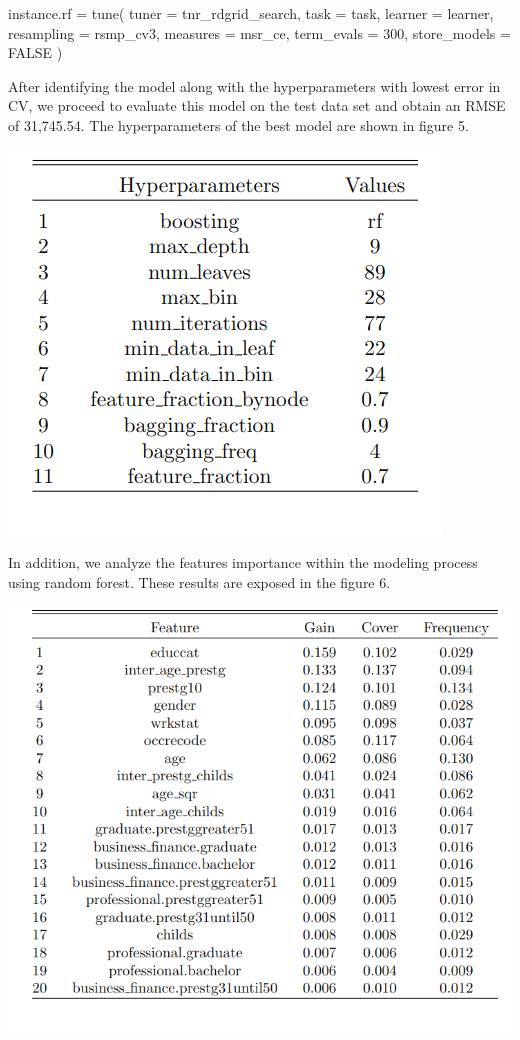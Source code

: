 \documentclass[11pt,a4paper]{article}
\let\origfigure\figure
\let\endorigfigure\endfigure
\renewenvironment{figure}[1][2] {
    \expandafter\origfigure\expandafter[H]
} {
    \endorigfigure
}
\newenvironment{Shaded}{\begin{snugshade}}{\end{snugshade}}
\newcommand{\AttributeTok}[1]{\textcolor[rgb]{0.77,0.63,0.00}{#1}}
\newcommand{\ConstantTok}[1]{\textcolor[rgb]{0.00,0.00,0.00}{#1}}
\newcommand{\DecValTok}[1]{\textcolor[rgb]{0.00,0.00,0.81}{#1}}
\newcommand{\FunctionTok}[1]{\textcolor[rgb]{0.00,0.00,0.00}{#1}}
\newcommand{\NormalTok}[1]{#1}
\newcommand{\OtherTok}[1]{\textcolor[rgb]{0.56,0.35,0.01}{#1}}
\begin{document}
\begin{Shaded}
\begin{Highlighting}[]
\NormalTok{instance.rf }\OtherTok{=} \FunctionTok{tune}\NormalTok{(}
  \AttributeTok{tuner =}\NormalTok{ tnr\_rdgrid\_search,}
  \AttributeTok{task =}\NormalTok{ task,}
  \AttributeTok{learner =}\NormalTok{ learner,}
  \AttributeTok{resampling =}\NormalTok{ rsmp\_cv3,}
  \AttributeTok{measures =}\NormalTok{ msr\_ce,}
  \AttributeTok{term\_evals =} \DecValTok{300}\NormalTok{,}
  \AttributeTok{store\_models =} \ConstantTok{FALSE}
\NormalTok{)}
\end{Highlighting}
\end{Shaded}

After identifying the model along with the hyperparameters with lowest
error in CV, we proceed to evaluate this model on the test data set and
obtain an RMSE of 31,745.54. The hyperparameters of the best model are
shown in figure 5.

\begin{figure}
\includegraphics[width=0.5\linewidth]{includes/RF_hyper} \caption{Best Hyperparameters for Random Forest}\label{fig:unnamed-chunk-1}
\end{figure}

In addition, we analyze the features importance within the modeling
process using random forest. These results are exposed in the figure 6.

\begin{figure}
\centering
\includegraphics{includes/RF_importance.png}
\caption{Top 20 of Features Importance for Random Forest}
\end{figure}
\end{document}

